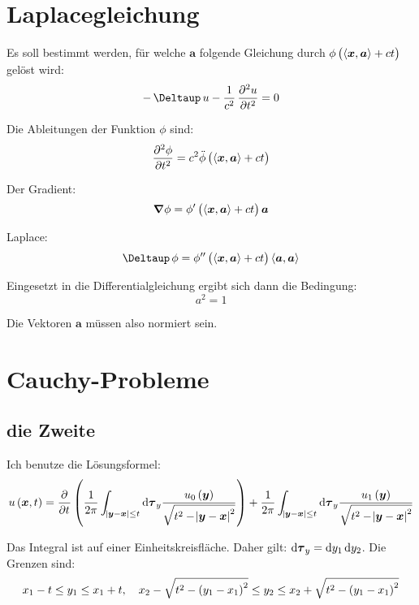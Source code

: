 \documentclass[11pt, ngerman, fleqn]{article}
\newcommand{\inner}[2]{\left\langle #1, #2 \right\rangle}
\newcommand{\laplace}{\mathop{{}\Deltaup}\nolimits}
\newcommand{\vnabla}{\vec \nabla}
\renewcommand{\vec}[1]{\boldsymbol{#1}}
\begin{document}

\section{Laplacegleichung}
\label{2}

Es soll bestimmt werden, für welche $\vec a$ folgende Gleichung durch $\phi\del{\inner{\vec x}{\vec a} + ct}$ gelöst wird:
\[
	- \laplace u - \frac1{c^2} \dpd[2] ut = 0
\]

Die Ableitungen der Funktion $\phi$ sind:
\[
	\dpd[2]\phi t = c^2 \ddot \phi\del{\inner{\vec x}{\vec a} + ct}
\]

Der Gradient:
\[
	\vnabla \phi = \phi'\del{\inner{\vec x}{\vec a} + ct} \vec a
\]

Laplace:
\[
	\laplace \phi = \phi''\del{\inner{\vec x}{\vec a} + ct} \inner{\vec a}{\vec a}
\]

Eingesetzt in die Differentialgleichung ergibt sich dann die Bedingung:
\[
	a^2 = 1
\]

Die Vektoren $\vec a$ müssen also normiert sein.


\section{Cauchy-Probleme}
\label{3}


\subsection{die Zweite}

Ich benutze die Lösungsformel:
\[
	u\del{\vec x, t} = \dpd{}t \del{
		\frac{1}{2 \pi} \int_{\abs{\vec y - \vec x} \leq t} \dif \vec \tau_y \frac{u_0\del{\vec y}}{\sqrt{t^2 - \abs{\vec y - \vec x}^2}}
	}
	+
	\frac{1}{2 \pi} \int_{\abs{\vec y - \vec x} \leq t} \dif \vec \tau_y \frac{u_1\del{\vec y}}{\sqrt{t^2 - \abs{\vec y - \vec x}^2}}
\]

Das Integral ist auf einer Einheitskreisfläche. Daher gilt: \( \dif \vec \tau_y = \dif y_1 \dif y_2 \). Die Grenzen sind:
\[
	x_1 - t \leq y_1 \leq x_1 + t
	,\quad
	x_2 - \sqrt{t^2-\del{y_1 - x_1}^2} \leq y_2 \leq x_2 + \sqrt{t^2-\del{y_1 - x_1}^2}
\]
\end{document}
